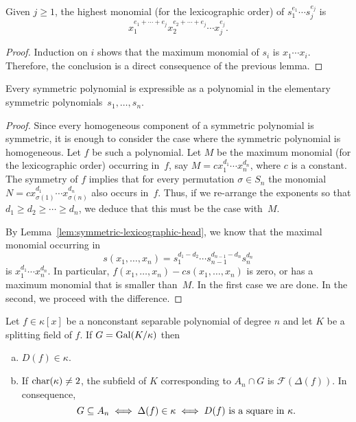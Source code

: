 \begin{lem}\label{lem:symmetric-lexicographic-head}
    Given\/ $j\ge1$, the highest monomial (for the lexicographic order) of\/ $s_1^{e_1}\cdots s_j^{e_j}$ is
    $$
        x_1^{e_1+\cdots+e_j}x_2^{e_2+\cdots+e_j}\cdots x_j^{e_j}.
    $$
\end{lem}

\begin{proof}
    Induction on $i$ shows that the maximum monomial of $s_i$ is $x_1\cdots x_i$. Therefore, the conclusion is a direct consequence of the previous lemma.
\end{proof}

\begin{thm}\label{thm:symmetric-from-elementary-symmetric}
    Every symmetric polynomial is expressible as a polynomial in the elementary symmetric polynomials\/~$s_1,\dots,s_n$.
\end{thm}

\begin{proof}
    Since every homogeneous component of a symmetric polynomial is symmetric, it is enough to consider the case where the symmetric polynomial is homogeneous. Let $f$ be such a polynomial. Let $M$ be the maximum monomial (for the lexicographic order) occurring in~$f$, say $M=cx_1^{d_1}\cdots x_n^{d_n}$, where $c$ is a constant. The symmetry of $f$ implies that for every permutation $\sigma\in S_n$ the monomial $N=cx_{\sigma(1)}^{d_1}\cdots x_{\sigma(n)}^{d_n}$ also occurs in~$f$. Thus, if we re-arrange the exponents so that $d_1\ge d_2\ge\cdots\ge d_n$, we deduce that this must be the case with~$M$.

    By Lemma~\ref{lem:symmetric-lexicographic-head}, we know that the maximal monomial occurring in
    $$
        s(x_1,\dots,x_n)=s_1^{d_1-d_2}\cdots s_{n-1}^{d_{n-1}-d_n}s_n^{d_n}
    $$
    is $x_1^{d_1}\cdots x_n^{d_n}$. In particular, $f(x_1,\dots,x_n)-cs(x_1,\dots,x_n)$ is zero, or has a maximum monomial that is smaller than~$M$. In the first case we are done. In the second, we proceed with the difference.
\end{proof}

\begin{thm}\label{thm:square-discriminant}
    Let $f\in\kappa[x]$ be a nonconstant separable polynomial of degree $n$ and let $K$ be a splitting field of $f$. If $G=\operatorname{Gal}(K/\kappa)$ then
    \begin{enumerate}[a), font=\upshape]
        \item $D(f)\in\kappa$.
        \item If $\operatorname{char}(\kappa)\ne2$, the subfield of $K$ corresponding to $A_n\cap G$ is $\mathcal F(\Delta(f))$. In consequence,
        $$
            G\subseteq A_n\iff \Delta(f)\in\kappa\iff D(f)\text{\rm\ is a square in }\kappa.
        $$
    \end{enumerate}
\end{thm}


